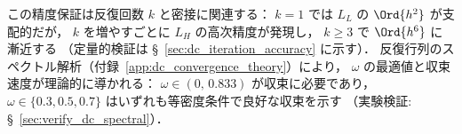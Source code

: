 この精度保証は反復回数 $k$ と密接に関連する：
$k=1$ では $L_L$ の $\Ord{h^2}$ が支配的だが，
$k$ を増やすごとに $L_H$ の高次精度が発現し，
$k \geq 3$ で $\Ord{h^6}$ に漸近する
（定量的検証は §~\ref{sec:dc_iteration_accuracy} に示す）．
反復行列のスペクトル解析（付録~\ref{app:dc_convergence_theory}）により，
$\omega$ の最適値と収束速度が理論的に導かれる：
$\omega \in (0,\, 0.833)$ が収束に必要であり，
$\omega \in \{0.3, 0.5, 0.7\}$ はいずれも等密度条件で良好な収束を示す
（実験検証: §~\ref{sec:verify_dc_spectral}）．

\label{sec:dc_comparison}%

